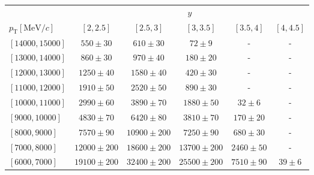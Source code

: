 \renewcommand{\arraystretch}{1.0}
\begin{tabular}{lr@{\hskip+0.2em}c@{\hskip+0.2em}r@{\hskip+0.2em}c@{\hskip+0.2em}rr@{\hskip+0.2em}c@{\hskip+0.2em}r@{\hskip+0.2em}c@{\hskip+0.2em}rr@{\hskip+0.2em}c@{\hskip+0.2em}r@{\hskip+0.2em}c@{\hskip+0.2em}rr@{\hskip+0.2em}c@{\hskip+0.2em}r@{\hskip+0.2em}c@{\hskip+0.2em}rr@{\hskip+0.2em}c@{\hskip+0.2em}r@{\hskip+0.2em}c@{\hskip+0.2em}r}
\toprule&\multicolumn{25}{c}{$y$}\\
$p_{\text{T}} [\text{MeV}/c]$ & \multicolumn{5}{c}{$[2,2.5]$} & \multicolumn{5}{c}{$[2.5,3]$} & \multicolumn{5}{c}{$[3,3.5]$} & \multicolumn{5}{c}{$[3.5,4]$} & \multicolumn{5}{c}{$[4,4.5]$} \\
\midrule$[14000,15000]$ & \multicolumn{5}{c}{$550 \pm 30$} & \multicolumn{5}{c}{$610 \pm 30$} & \multicolumn{5}{c}{$72 \pm 9$} & \multicolumn{5}{c}{-} & \multicolumn{5}{c}{-} \\
$[13000,14000]$ & \multicolumn{5}{c}{$860 \pm 30$} & \multicolumn{5}{c}{$970 \pm 40$} & \multicolumn{5}{c}{$180 \pm 20$} & \multicolumn{5}{c}{-} & \multicolumn{5}{c}{-} \\
$[12000,13000]$ & \multicolumn{5}{c}{$1250 \pm 40$} & \multicolumn{5}{c}{$1580 \pm 40$} & \multicolumn{5}{c}{$420 \pm 30$} & \multicolumn{5}{c}{-} & \multicolumn{5}{c}{-} \\
$[11000,12000]$ & \multicolumn{5}{c}{$1910 \pm 50$} & \multicolumn{5}{c}{$2520 \pm 50$} & \multicolumn{5}{c}{$890 \pm 30$} & \multicolumn{5}{c}{-} & \multicolumn{5}{c}{-} \\
$[10000,11000]$ & \multicolumn{5}{c}{$2990 \pm 60$} & \multicolumn{5}{c}{$3890 \pm 70$} & \multicolumn{5}{c}{$1880 \pm 50$} & \multicolumn{5}{c}{$32 \pm 6$} & \multicolumn{5}{c}{-} \\
$[9000,10000]$ & \multicolumn{5}{c}{$4830 \pm 70$} & \multicolumn{5}{c}{$6420 \pm 80$} & \multicolumn{5}{c}{$3810 \pm 70$} & \multicolumn{5}{c}{$170 \pm 20$} & \multicolumn{5}{c}{-} \\
$[8000,9000]$ & \multicolumn{5}{c}{$7570 \pm 90$} & \multicolumn{5}{c}{$10900 \pm 200$} & \multicolumn{5}{c}{$7250 \pm 90$} & \multicolumn{5}{c}{$680 \pm 30$} & \multicolumn{5}{c}{-} \\
$[7000,8000]$ & \multicolumn{5}{c}{$12000 \pm 200$} & \multicolumn{5}{c}{$18600 \pm 200$} & \multicolumn{5}{c}{$13700 \pm 200$} & \multicolumn{5}{c}{$2460 \pm 50$} & \multicolumn{5}{c}{-} \\
$[6000,7000]$ & \multicolumn{5}{c}{$19100 \pm 200$} & \multicolumn{5}{c}{$32400 \pm 200$} & \multicolumn{5}{c}{$25500 \pm 200$} & \multicolumn{5}{c}{$7510 \pm 90$} & \multicolumn{5}{c}{$39 \pm 6$} \\

\end{tabular}
